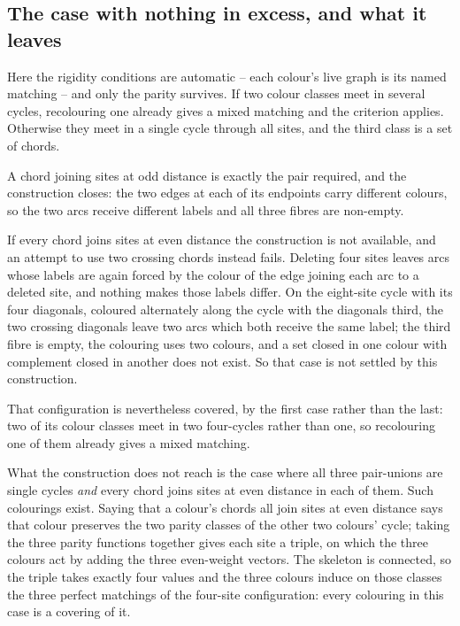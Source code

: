 \documentclass[11pt]{article}
\theoremstyle{definition}
\theoremstyle{remark}
\begin{document}
\subsection*{The case with nothing in excess, and what it leaves}

Here the rigidity conditions are automatic -- each colour's live graph is its named matching -- and only
the parity survives.  If two colour classes meet in several cycles, recolouring one already gives a
mixed matching and the criterion applies.  Otherwise they meet in a single cycle through all sites,
and the third class is a set of chords.

A chord joining sites at odd distance is exactly the pair required, and the construction closes: the
two edges at each of its endpoints carry different colours, so the two arcs receive different labels
and all three fibres are non-empty.

If every chord joins sites at even distance the construction is not available, and an attempt to use
two crossing chords instead fails.  Deleting four sites leaves arcs whose labels are again forced by
the colour of the edge joining each arc to a deleted site, and nothing makes those labels differ.  On
the eight-site cycle with its four diagonals, coloured alternately along the cycle with the diagonals
third, the two crossing diagonals leave two arcs which both receive the same label; the third fibre
is empty, the colouring uses two colours, and a set closed in one colour with complement closed in
another does not exist.  So that case is not settled by this construction.

That configuration is nevertheless covered, by the first case rather than the last: two of its colour
classes meet in two four-cycles rather than one, so recolouring one of them already gives a mixed
matching.

What the construction does not reach is the case where all three pair-unions are single cycles
\emph{and} every chord joins sites at even distance in each of them.  Such colourings exist.  Saying
that a colour's chords all join sites at even distance says that colour preserves the two parity
classes of the other two colours' cycle; taking the three parity functions together gives each site a
triple, on which the three colours act by adding the three even-weight vectors.  The skeleton is
connected, so the triple takes exactly four values and the three colours induce on those classes the
three perfect matchings of the four-site configuration: every colouring in this case is a covering of
it.
\end{document}
